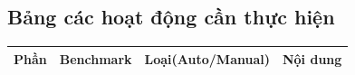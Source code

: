 \subsection{Bảng các hoạt động cần thực hiện}\label{bang-cac-hoat-dong-can-thuc-hien}

{\def\LTcaptype{none}
\begin{center}
\label{tab:bang-cac-hoat-dong-can-thuc-hien}
\end{center}
\begin{longtable}[]{@{}|
  >{\raggedright\arraybackslash}p{}|
  >{\raggedright\arraybackslash}p{}|
  >{\raggedright\arraybackslash}p{}|
  >{\raggedright\arraybackslash}p{}|@{}}
\hline
\begin{minipage}[b]{\linewidth}\raggedright
\textbf{Phần}
\end{minipage} & \begin{minipage}[b]{\linewidth}\raggedright
\textbf{Benchmark}
\end{minipage} & \begin{minipage}[b]{\linewidth}\raggedright
\textbf{Loại(Auto/Manual)}
\end{minipage} & \begin{minipage}[b]{\linewidth}\raggedright
\textbf{Nội dung}
\end{minipage} \\
\hline
\endhead


\end{longtable}}
